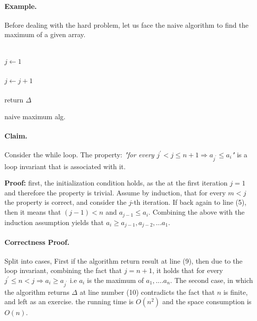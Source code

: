 \paragraph{Example.} Before dealing with the hard problem, let us face the naive algorithm to find the maximum of a given array.

\begin{algorithm}[H]
{}
 \ \\ 
  { 
        \( j \leftarrow 1 \) \\
        \ \\
         {
        \( j \leftarrow j + 1 \)    
        }
        \\
        \ \\ 
    } 
return \( \Delta \) 
 \caption{naive maximum alg.}
\end{algorithm}
\paragraph{Claim.} Consider the while loop. The property: \textit{"for every \(j^\prime < j \le n+1 \Rightarrow a_{j^\prime} \le a_i \)"} is a loop invariant that is associated with it. 

\textbf{Proof:} first, the initialization condition holds, as the at the first iteration \(j=1\) and therefore the property is trivial.
Assume by induction, that for every \(m < j\) the property is correct, and consider the \(j\)-th iteration. If back again to line (5), then it means that \( (j-1) < n\) and \( a_{j-1} \le a_{i} \). Combining the above with the induction assumption yields that \(a_i \ge a_{j-1},a_{j-2}, ... a_{1}\).    

\paragraph{Correctness Proof.} Split into cases, First if the algorithm return result at line (9), then due to the loop invariant, combining the fact that \( j = n + 1\), it holds that for every \(j^\prime  \le n < j \Rightarrow a_i \ge a_{j^\prime} \)  i.e \(a_i\) is the maximum of \(a_1, .... a_n \). The second case, in which the algorithm returns \( \Delta \) at line number (10) contradicts the fact that \(n\) is finite, and left as an exercise.  the running time is \( O(n^2) \) and the space consumption is \(O(n)\). 

